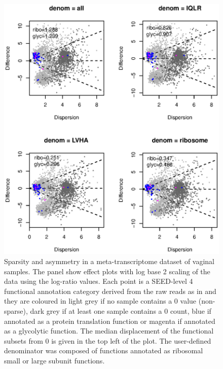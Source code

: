 \documentclass[graybox]{svmult}
\begin{document}
%
\begin{figure}[b]
\sidecaption[t]
\includegraphics[scale=.45]{MAx4-book.eps}
%
%
\caption{Sparsity and asymmetry in a meta-transcriptome dataset of vaginal samples.  The panel show effect plots with log base 2 scaling of the data using the log-ratio values. Each point is a SEED-level 4 functional annotation category derived from the raw reads as in \cite{Macklaim:2018aa} and they are coloured in light grey if no sample contains a 0 value (non-sparse), dark grey if at least one sample contains a 0 count, blue if annotated as a protein translation function or magenta if annotated as a glycolytic function. The median displacement of the functional subsets from 0 is given in the top left of the plot.  The user-defined denominator was composed of functions annotated as ribosomal small or large subunit functions.  }
\label{Fig:f3a}       %
\end{figure}
\end{document}
